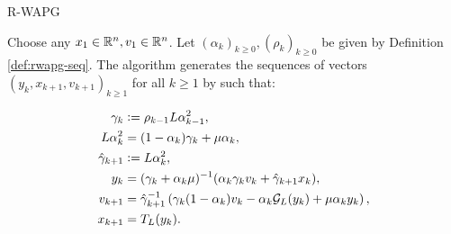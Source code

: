\documentclass[11pt]{beamer}
\theoremstyle{definition}
\begin{document}
        \begin{frame}{R-WAPG}
            \begin{definition}[R-WAPG]\label{def:wapg}
                Choose any $x_1 \in \mathbb R^n, v_1 \in \mathbb R^n$.
                Let $(\alpha_k)_{k \ge0}, (\rho_k)_{k \ge 0}$ be given by Definition \ref{def:rwapg-seq}.
                The algorithm generates the sequences of vectors $(y_k, x_{k + 1}, v_{k + 1})_{k \ge 1}$ for all $k\ge 1$ by such that:
                \begin{tcolorbox}\vspace{-1em}
                    \begin{align*}
                        \gamma_k &\vcentcolon= \rho_{k -1}L\alpha_{k - 1}^2,
                        \\
                        L\alpha_k^2 &= (1 - \alpha_k)\gamma_k + \mu \alpha_k, 
                        \\
                        \hat \gamma_{k + 1} & \vcentcolon= L\alpha_k^2,
                        \\
                        y_k &=
                        (\gamma_k + \alpha_k \mu)^{-1}(\alpha_k \gamma_k v_k + \hat\gamma_{k + 1} x_k),
                        \\
                        v_{k + 1} &=
                        \hat\gamma^{-1}_{k + 1}
                        \left(\gamma_k(1 - \alpha_k) v_k - \alpha_k \mathcal G_L (y_k) + \mu \alpha_k y_k\right),
                        \\
                        x_{k + 1} &= T_L (y_k).
                    \end{align*}
                \end{tcolorbox}
            \end{definition}
        \end{frame}
\end{document}
